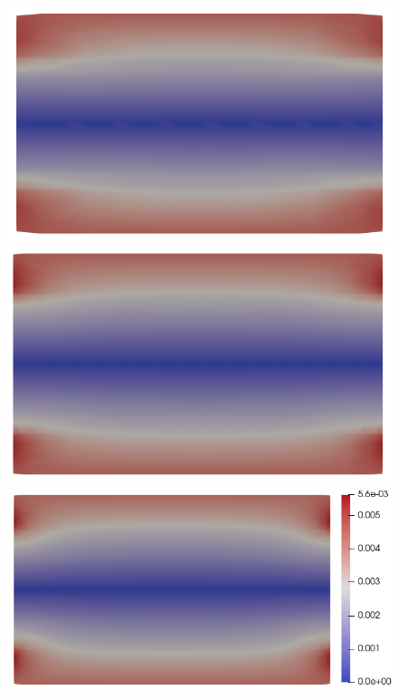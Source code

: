 \documentclass{article}
\begin{document}
\begin{figure}
\begin{minipage}{0.9\textwidth}
    \hspace{0.0cm}
    \includegraphics[scale=0.27]{slice_B_T-1_lambda-0_8-2-2.png}\hspace{0.02cm}
    \includegraphics[scale=0.27]{slice_B_T-1_lambda-0_16-3-3.png}\hspace{0.02cm}
    \includegraphics[scale=0.27]{slice_B_T-1_lambda-0_32-3-4.png}
    

\end{minipage}
\end{figure}
\end{document}
